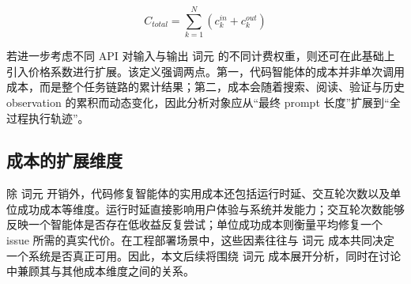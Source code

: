 \[
C_{total} = \sum_{k=1}^{N}(c_k^{in} + c_k^{out})
\]

若进一步考虑不同 API 对输入与输出 词元 的不同计费权重，则还可在此基础上引入价格系数进行扩展。该定义强调两点。第一，代码智能体的成本并非单次调用成本，而是整个任务链路的累计结果；第二，成本会随着搜索、阅读、验证与历史 observation 的累积而动态变化，因此分析对象应从“最终 prompt 长度”扩展到“全过程执行轨迹”。

\subsection{成本的扩展维度}

除 词元 开销外，代码修复智能体的实用成本还包括运行时延、交互轮次数以及单位成功成本等维度。运行时延直接影响用户体验与系统并发能力；交互轮次数能够反映一个智能体是否存在低收益反复尝试；单位成功成本则衡量平均修复一个 issue 所需的真实代价。在工程部署场景中，这些因素往往与 词元 成本共同决定一个系统是否真正可用。因此，本文后续将围绕 词元 成本展开分析，同时在讨论中兼顾其与其他成本维度之间的关系。

